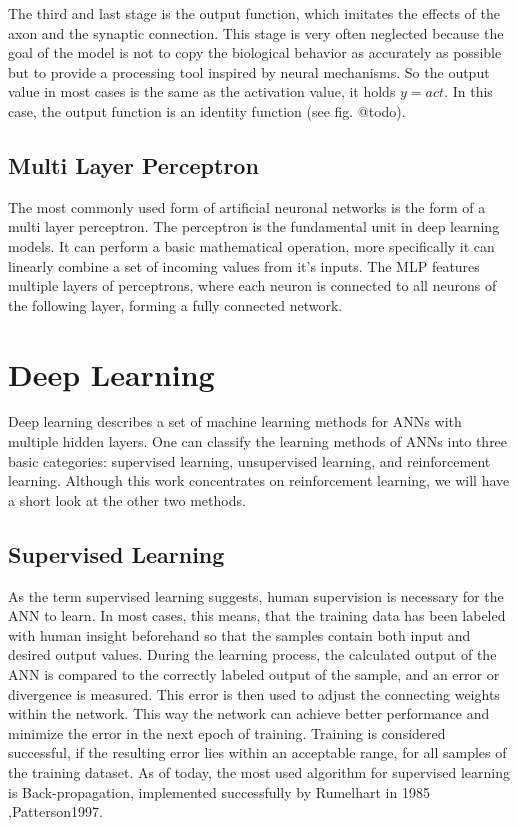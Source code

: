 \documentclass[12pt,a4paper]{article}
\begin{document}
The third and last stage is the output function, which imitates the effects of the axon and the synaptic connection. This stage is very often neglected because the goal of the model is not to copy the biological behavior as accurately as possible but to provide a processing tool inspired by neural mechanisms. So the output value in most cases is the same as the activation value, it holds $y = act$. In this case, the output function is an identity function (see fig. @todo).
\subsection{Multi Layer Perceptron}
The most commonly used form of artificial neuronal networks is the form of a multi layer perceptron. The perceptron is the fundamental unit in deep learning models. It can perform a basic mathematical operation, more specifically it can linearly
combine a set of incoming values from it's inputs. The MLP features multiple layers of perceptrons, where each neuron is connected to all neurons of the following layer, forming a fully connected network.
\section{Deep Learning}
Deep learning describes a set of machine learning methods for ANNs with multiple hidden layers. One can classify the learning methods of ANNs into three basic categories:  supervised learning, unsupervised learning, and reinforcement learning. Although this work concentrates on reinforcement learning, we will have a short look at the other two methods.
\subsection{Supervised Learning}
As the term supervised learning suggests, human supervision is necessary for the ANN to learn. In most cases, this means, that the training data has been labeled with human insight beforehand so that the samples contain both input and desired output values. During the learning process, the calculated output of the ANN is compared to the correctly labeled output of the sample, and an error or divergence is measured. This error is then used to adjust the connecting weights within the network. This way the network can achieve better performance and minimize the error in the next epoch of training. 
Training is considered successful, if the resulting error lies within an acceptable range, for all samples of the training dataset.
As of today, the most used algorithm for supervised learning is Back-propagation, implemented successfully by Rumelhart in 1985 \cite{Rumelhart1985},{Patterson1997}.
\end{document}
